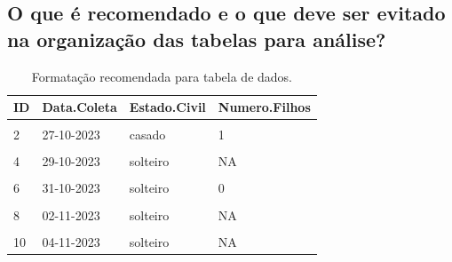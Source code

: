 \documentclass[
  a4paper,
]{book}
\begin{document}
\hypertarget{o-que-uxe9-recomendado-e-o-que-deve-ser-evitado-na-organizauxe7uxe3o-das-tabelas-para-anuxe1lise}{%
\subsection{O que é recomendado e o que deve ser evitado na organização das tabelas para análise?}\label{o-que-uxe9-recomendado-e-o-que-deve-ser-evitado-na-organizauxe7uxe3o-das-tabelas-para-anuxe1lise}}

\begin{table}

\caption{\label{tab:tabela-recomendada}Formatação recomendada para tabela de dados.}
\centering
\begin{tabu} to 
\toprule
\textbf{ID} & \textbf{Data.Coleta} & \textbf{Estado.Civil} & \textbf{Numero.Filhos}\\
\midrule
{} &  &  & \\
2 & 27-10-2023 & casado & 1\\
 &  &  & \\
4 & 29-10-2023 & solteiro & NA\\
 &  &  & \\
6 & 31-10-2023 & solteiro & 0\\
 &  &  & \\
8 & 02-11-2023 & solteiro & NA\\
 &  &  & \\
10 & 04-11-2023 & solteiro & NA\\
\bottomrule
\end{tabu}
\end{table}
\end{document}
